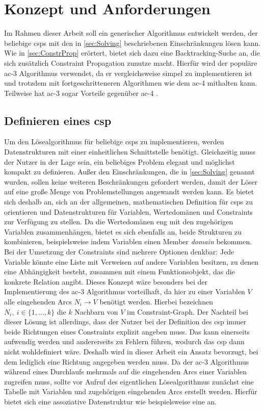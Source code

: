 \section{Konzept und Anforderungen}
\label{sec:Concept}
Im Rahmen dieser Arbeit soll ein generischer Algorithmus entwickelt werden, der beliebige \acp{csp} mit den in \cref{sec:Solving} beschriebenen Einschränkungen lösen kann. Wie in
\cref{sec:ConstrProp} erörtert, bietet sich dazu eine Backtracking-Suche an, die sich zusätzlich Constraint Propagation zunutze macht. Hierfür wird der populäre \ac*{ac}-3
Algorithmus verwendet, da er vergleichsweise simpel zu implementieren ist und trotzdem mit fortgeschritteneren Algorithmen wie dem \ac*{ac}-4 mithalten kann. Teilweise hat
\ac*{ac}-3 sogar Vorteile gegenüber \ac*{ac}-4 \cite{ACAgain}.

\subsection{Definieren eines \ac*{csp}}
\label{sec:CSPDef}
Um den Lösealgorithmus für beliebige \acp{csp} zu implementieren, werden Datenstrukturen mit einer einheitlichen Schnittstelle benötigt. Gleichzeitig muss der Nutzer in der Lage
sein, ein beliebiges Problem elegant und möglichst kompakt zu definieren. Außer den Einschränkungen, die in \cref{sec:Solving} genannt wurden, sollen keine weiteren Beschränkungen
gefordert werden, damit der Löser auf eine große Menge von Problemstellungen angewandt werden kann. Es bietet sich deshalb an, sich an der allgemeinen, mathematischen Definition
für \acp{csp} zu orientieren und Datenstrukturen für Variablen, Wertedomänen und Constraints zur Verfügung zu stellen. Da die Wertedomänen eng mit den zugehörigen Variablen
zusammenhängen, bietet es sich ebenfalls an, beide Strukturen zu kombinieren, beispielsweise indem Variablen einen Member \textit{domain} bekommen. Bei der Umsetzung der
Constraints sind mehrere Optionen denkbar: Jede Variable könnte eine Liste mit Verweisen auf andere Variablen besitzen, zu denen eine Abhängigkeit besteht, zusammen mit einem
Funktionsobjekt, das die konkrete Relation angibt. Dieses Konzept wäre besonders bei der Implementierung des \ac*{ac}-3 Algorithmus vorteilhaft, da hier zu einer Variablen $V$ alle
eingehenden Arcs $N_i \rightarrow V$ benötigt werden. Hierbei bezeichnen $N_i, \ i \in \{1, \dots, k\}$ die $k$ Nachbarn von $V$ im Constraint-Graph. Der Nachteil bei dieser Lösung
ist allerdings, dass der Nutzer bei der Definition des \ac*{csp} immer beide Richtungen eines Constraints explizit angeben muss. Das kann einerseits aufwendig werden und andererseits
zu Fehlern führen, wodurch das \ac*{csp} dann nicht wohldefiniert wäre. Deshalb wird in dieser Arbeit ein Ansatz bevorzugt, bei dem lediglich eine Richtung angegeben werden muss.
Da der \ac*{ac}-3 Algorithmus während eines Durchlaufs mehrmals auf die eingehenden Arcs einer Variablen zugreifen muss, sollte vor Aufruf des eigentlichen Lösealgorithmus zunächst
eine Tabelle mit Variablen und zugehörigen eingehenden Arcs erstellt werden. Hierfür bietet sich eine assoziative Datenstruktur wie beispielsweise eine 
an.

